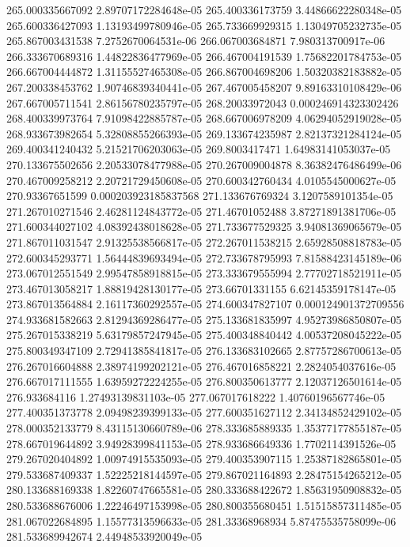 {265.000335667092 2.89707172284648e-05
265.400336173759 3.44866622280348e-05
265.600336427093 1.13193499780946e-05
265.733669929315 1.13049705232735e-05
265.867003431538 7.2752670064531e-06
266.067003684871 7.980313700917e-06
266.333670689316 1.44822836477969e-05
266.467004191539 1.75682201784753e-05
266.667004444872 1.31155527465308e-05
266.867004698206 1.50320382183882e-05
267.200338453762 1.90746839340441e-05
267.467005458207 9.89163310108429e-06
267.667005711541 2.86156780235797e-05
268.20033972043 0.000246914323302426
268.400339973764 7.91098422885787e-05
268.667006978209 4.06294052919028e-05
268.933673982654 5.32808855266393e-05
269.133674235987 2.82137321284124e-05
269.400341240432 5.21521706203063e-05
269.8003417471 1.64983141053037e-05
270.133675502656 2.20533078477988e-05
270.267009004878 8.36382476486499e-06
270.467009258212 2.20721729450608e-05
270.600342760434 4.0105545000627e-05
270.93367651599 0.000203923185837568
271.133676769324 3.1207589101354e-05
271.267010271546 2.46281124843772e-05
271.46701052488 3.87271891381706e-05
271.600344027102 4.08392438018628e-05
271.733677529325 3.94081369065679e-05
271.867011031547 2.91325538566817e-05
272.267011538215 2.65928508818783e-05
272.600345293771 1.56444839693494e-05
272.733678795993 7.81588423145189e-06
273.067012551549 2.99547858918815e-05
273.333679555994 2.77702718521911e-05
273.467013058217 1.88819428130177e-05
273.66701331155 6.62145359178147e-05
273.867013564884 2.16117360292557e-05
274.600347827107 0.000124901372709556
274.933681582663 2.81294369286477e-05
275.133681835997 4.95273986850807e-05
275.267015338219 5.63179857247945e-05
275.400348840442 4.00537208045222e-05
275.800349347109 2.72941385841817e-05
276.133683102665 2.87757286700613e-05
276.267016604888 2.38974199202121e-05
276.467016858221 2.2824054037616e-05
276.667017111555 1.63959272224255e-05
276.800350613777 2.12037126501614e-05
276.933684116 1.27493139831103e-05
277.067017618222 1.40760196567746e-05
277.400351373778 2.09498239399133e-05
277.600351627112 2.34134852429102e-05
278.000352133779 8.43115130660789e-06
278.333685889335 1.35377177855187e-05
278.667019644892 3.94928399841153e-05
278.933686649336 1.7702114391526e-05
279.267020404892 1.00974915535093e-05
279.400353907115 1.25387182865801e-05
279.533687409337 1.52225218144597e-05
279.867021164893 2.28475154265212e-05
280.133688169338 1.82260747665581e-05
280.333688422672 1.85631950908832e-05
280.533688676006 1.22246497153998e-05
280.800355680451 1.51515857311485e-05
281.067022684895 1.15577313596633e-05
281.33368968934 5.87475535758099e-06
281.533689942674 2.44948533920049e-05
}
